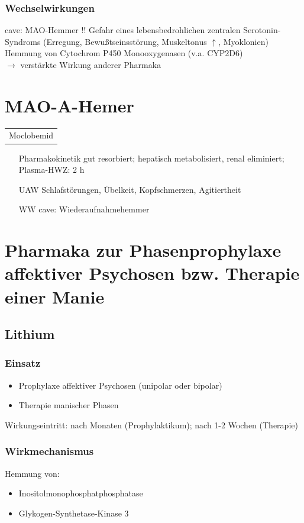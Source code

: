 \documentclass[10pt,a4paper]{report}
\begin{document}
\subsubsection{Wechselwirkungen} %
\label{ssub:wechselwirkungen}
cave: MAO-Hemmer !! 
Gefahr eines lebensbedrohlichen zentralen Serotonin-Syndroms
(Erregung, Bewußtseinsstörung, Muskeltonus $\uparrow$, Myoklonien)
Hemmung von Cytochrom P450 Monooxygenasen (v.a. CYP2D6)\\
$\rightarrow$ verstärkte Wirkung anderer Pharmaka
\section{MAO-A-Hemer} %
\label{sec:mao_a_hemer}
\begin{tabular}{c}
Moclobemid
\end{tabular}
\begin{itemize}
	\item[Pharmakokinetik] gut resorbiert; hepatisch metabolisiert, renal eliminiert; Plasma-HWZ: 2 h
	\item[UAW] Schlafstörungen, Übelkeit, Kopfschmerzen, Agitiertheit
	\item[WW] cave: Wiederaufnahmehemmer
\end{itemize}
\section{Pharmaka zur Phasenprophylaxe affektiver Psychosen bzw. Therapie einer Manie} %
\label{sec:pharmaka_zur_phasenprophylaxe_affektiver_psychosen_bzw_therapie_einer_manie}
\subsection{Lithium} %
\label{sub:lithium}
\subsubsection{Einsatz} %
\label{ssub:einsatz}
\begin{itemize}
	\item Prophylaxe affektiver Psychosen (unipolar oder bipolar)
	\item Therapie manischer Phasen
\end{itemize}
Wirkungseintritt: nach Monaten (Prophylaktikum); nach 1-2 Wochen (Therapie)
\subsubsection{Wirkmechanismus} %
\label{ssub:wirkmechanismus}
Hemmung von:
\begin{itemize}
	\item Inositolmonophosphatphosphatase
	\item Glykogen-Synthetase-Kinase 3
\end{itemize}
\end{document}
